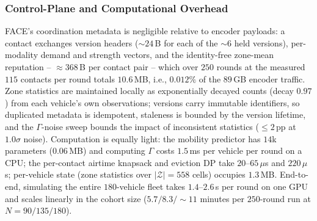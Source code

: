 \subsubsection{Control-Plane and Computational Overhead}
FACE's coordination metadata is negligible relative to encoder
payloads: a contact exchanges version headers (${\sim}24$\,B for each
of the ${\sim}6$ held versions), per-modality demand and strength
vectors, and the identity-free zone-mean reputation --
${\approx}368$\,B per contact pair -- which over $250$ rounds at the
measured $115$ contacts per round totals $10.6$\,MB, i.e., $0.012\%$
of the $89$\,GB encoder traffic. Zone statistics are maintained
locally as exponentially decayed counts (decay $0.97$) from each
vehicle's own observations; versions carry immutable identifiers, so
duplicated metadata is idempotent, staleness is bounded by the
version lifetime, and the $\Gamma$-noise sweep bounds the impact of
inconsistent statistics ($\le 2$\,pp at $1.0\sigma$ noise).
Computation is equally light: the mobility predictor has $14$k
parameters ($0.06$\,MB) and computing $\Gamma$ costs $1.5$\,ms per
vehicle per round on a CPU; the per-contact airtime knapsack and
eviction DP take $20$--$65\,\mu$s and $220\,\mu$s; per-vehicle state
(zone statistics over $|\mathcal Z|{=}558$ cells) occupies $1.3$\,MB.
End-to-end, simulating the entire $180$-vehicle fleet takes
$1.4$--$2.6$\,s per round on one GPU and scales linearly in the
cohort size ($5.7/8.3/{\sim}11$ minutes per $250$-round run at
$N{=}90/135/180$).
